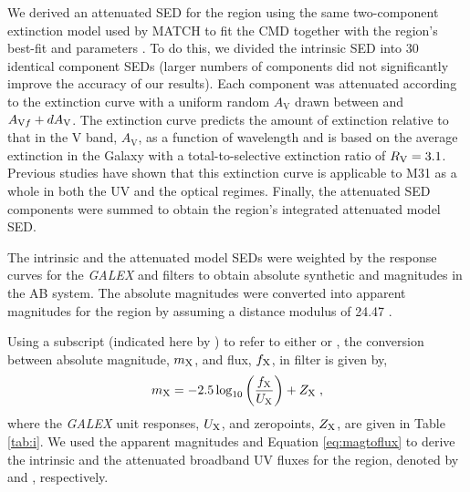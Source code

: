 \documentclass[iop, tighten]{emulateapj}
\begin{document}
\tabi

\figii


\figiii

We derived an attenuated SED for the region using the same two-component
extinction model used by MATCH to fit the CMD together with the region's
best-fit \avf{} and \dav{} parameters \citep{Lewis:2015}. To do this, we divided
the intrinsic SED into 30 identical component SEDs (larger numbers of components
did not significantly improve the accuracy of our results). Each component was
attenuated according to the \citet{Cardelli:1989} extinction curve with a
uniform random $A_\mathrm{V}$ drawn between \avf{} and $A_{\mathrm{V}f} + dA_\mathrm{V}$. The
\citet{Cardelli:1989} extinction curve predicts the amount of extinction
relative to that in the V band, $A_\mathrm{V}$, as a function of wavelength and
is based on the average extinction in the Galaxy with a total-to-selective
extinction ratio of $R_\mathrm{V} = 3.1$. Previous studies have shown that this
extinction curve is applicable to M31 as a whole in both the UV
\citep{Bianchi:1996} and the optical \citep{Barmby:2000} regimes. Finally, the
attenuated SED components were summed to obtain the region's integrated
attenuated model SED.

The intrinsic and the attenuated model SEDs were weighted by the response curves
for the \emph{GALEX} \fuv{} and \nuv{} filters to obtain absolute synthetic
\fuv{} and \nuv{} magnitudes in the AB system. The absolute magnitudes were
converted into apparent magnitudes for the region by assuming a distance modulus
of 24.47 \citep{McConnachie:2005}.

Using a subscript (indicated here by \filter{}) to refer to either \fuv{} or
\nuv{}, the conversion between absolute magnitude, $m_{\mathrm{X}}$, and flux,
$f_{\mathrm{X}}$, in filter \filter{} is given by,
%
\begin{equation}
m_\filter = -2.5 \log_{10}\left(\frac{f_\filter}{U_\filter}\right)
    + Z_\filter \; ,
\label{eq:magtoflux}
\end{equation}
%
where the \emph{GALEX} unit responses, $U_{\mathrm{X}}$, and zeropoints, $Z_{\mathrm{X}}$,
are given in Table \ref{tab:i}. We used the apparent magnitudes and Equation
\ref{eq:magtoflux} to derive the intrinsic and the attenuated broadband UV
fluxes for the region, denoted by \fxsfhz{} and \fxsfh{}, respectively.
\end{document}
